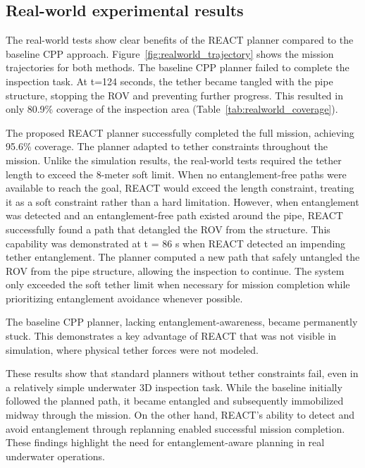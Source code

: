 \subsection{Real-world  experimental results}

The real-world tests show clear benefits of the \ac{REACT} planner compared to the baseline \ac{CPP} approach. Figure~\ref{fig:realworld_trajectory} shows the mission trajectories for both methods.
The baseline \ac{CPP} planner failed to complete the inspection task. At t=124 seconds, the tether became tangled with the pipe structure, stopping the \ac{ROV} and preventing further progress. This resulted in only 80.9\% coverage of the inspection area (Table~\ref{tab:realworld_coverage}).

The proposed \ac{REACT} planner successfully completed the full mission, achieving 95.6\% coverage. The planner adapted to tether constraints throughout the mission. Unlike the simulation results, the real-world tests required the tether length to exceed the 8-meter soft limit. When no entanglement-free paths were available to reach the goal, \ac{REACT} would exceed the length constraint, treating it as a soft constraint rather than a hard limitation. However, when entanglement was detected and an entanglement-free path existed around the pipe, \ac{REACT} successfully found a path that detangled the \ac{ROV} from the structure. This capability was demonstrated at t = 86 s when \ac{REACT} detected an impending tether entanglement. The planner computed a new path that safely untangled the \ac{ROV} from the pipe structure, allowing the inspection to continue. The system only exceeded the soft tether limit when necessary for mission completion while prioritizing entanglement avoidance whenever possible.

The baseline \ac{CPP} planner, lacking entanglement-awareness, became permanently stuck. This demonstrates a key advantage of \ac{REACT} that was not visible in simulation, where physical tether forces were not modeled.

These results show that standard planners without tether constraints fail, even in a relatively simple underwater 3D inspection task. While the baseline initially followed the planned path, it became entangled and subsequently immobilized midway through the mission. On the other hand, \ac{REACT}'s ability to detect and avoid entanglement through replanning enabled successful mission completion. These findings highlight the need for entanglement-aware planning in real underwater operations.



